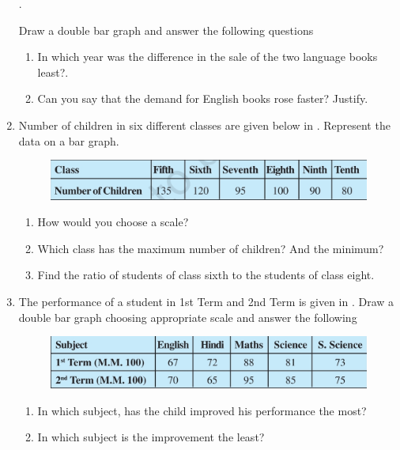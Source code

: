\begin{enumerate}[label=\thesection.\arabic*, ref=\thesection.\theenumi,resume*]
  .  
	\begin{table}[H]
  \centering
  
  \caption{}
  \label{tab:sale}
\end{table}
Draw a double bar graph and answer the following questions
\begin{enumerate}
\item In which year was the difference in the sale of the two language books least?.
\item  Can you say that the demand for English books rose faster? Justify.
\end{enumerate}
\item 
	Number of children in six different classes are given below
  in .
 Represent the data on a bar graph.
	\begin{figure}[H]
  \centering
  \includegraphics[width=\columnwidth]{figs/bar5.jpg}
  \caption{}
  \label{fig:bar5}
\end{figure}
\begin{enumerate}
	\item How would you choose a scale? 
	\item  Which class has the maximum number of children? And the minimum? 
	\item  Find the ratio of students of class sixth to the students of class eight.
\end{enumerate}
\item The performance of a student in 1st Term and 2nd Term is given
in .
	Draw a double bar graph choosing appropriate scale and answer the following
	\begin{figure}[H]
  \centering
  \includegraphics[width=\columnwidth]{figs/bar6.jpg}
  \caption{}
  \label{fig:bar6}
\end{figure}
\begin{enumerate}
\item In which subject, has the child improved his performance the most? 
\item In which subject is the improvement the least? 

\end{enumerate}
\end{enumerate}
